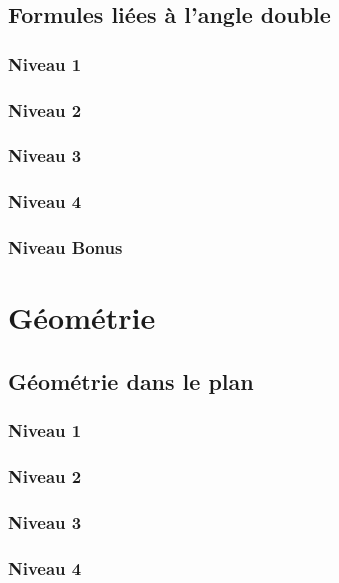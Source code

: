 \documentclass[a4paper]{report}
\begin{document}
		\section{Formules liées à l'angle double}
		
			\subsection{Niveau 1}
		
			\subsection{Niveau 2}
		
			\subsection{Niveau 3}
			
			\subsection{Niveau 4}
			
			\subsection{Niveau Bonus}
	
	\chapter{Géométrie}
	
		\section{Géométrie dans le plan}
		
			\subsection{Niveau 1}
		
			\subsection{Niveau 2}
		
			\subsection{Niveau 3}
			
			\subsection{Niveau 4}
			
\end{document}
